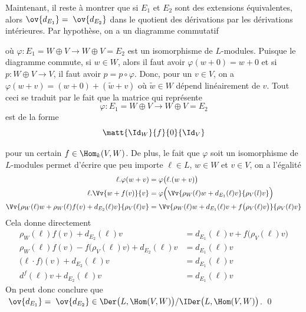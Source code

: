 \begin{Prop}
\begin{pre}
Maintenant, il reste à montrer que si $E_1$ et $E_2$ sont des extensions équivalentes, alors \linebreak $\ov{d_{E_1}} = \; \ov{d_{E_2}}$ dans le quotient des dérivations par les dérivations intérieures. Par hypothèse, on a un diagramme commutatif
\begin{center} \end{center}
où $\varphi : E_1 = W \oplus V \rightarrow W \oplus V = E_2$ est un isomorphisme de $L$-modules. Puisque le diagramme commute, si $w \in W$, alors il faut avoir $\varphi(w + 0) = w + 0$ et si $p : W \oplus V \rightarrow V$, il faut avoir $p = p \circ \varphi$. Donc, pour un $v \in V$,   on a $\varphi(w + v) = (w + 0) + (\tilde{w} + v)$ où $\tilde{w} \in W$ dépend linéairement de $v$. Tout ceci se traduit par le fait que la matrice qui représente 
$$ \varphi : E_1 = W \oplus V \rightarrow W \oplus V = E_2$$ 
est de la forme
$$ \matt{\Id_W}{f}{0}{\Id_V} $$

pour un certain $f \in \Hom_k(V,W)$. De plus, le fait que $\varphi$ soit un isomorphisme de $L$-modules permet d'écrire que peu importe $\ell \in L$, $w \in W$ et $v \in V$, on a l'égalité
\begin{align*}
\ell.\varphi(w + v) &= \varphi\big(\ell.(w + v)\big) \\
\ell.\Vv{w + f(v)}{v} &= \varphi\Big(\Vv{\rho_W(\ell)w + d_{E_1}(\ell)v}{\rho_V(l)v}\Big)\\
\Vv{\rho_W(\ell)w + \rho_W(\ell)f(v) + d_{E_2}(\ell)v}{\rho_V(\ell)v} &= \Vv{\rho_W(\ell)w + d_{E_1}(\ell)v + f\big(\rho_V(\ell)v\big)}{\rho_V(\ell)v}
\end{align*}
Cela donne directement 
\begin{align*}
\rho_W(\ell)f(v) + d_{E_2}(\ell)v &= d_{E_1}(\ell)v + f\big(\rho_V(\ell)v\big)\\
\rho_W(\ell)f(v) - f\big(\rho_V(\ell)v\big) + d_{E_2}(\ell)v &= d_{E_1}(\ell)v\\
\big(\ell \cdot f\big)(v) + d_{E_2}(\ell)v &= d_{E_1}(\ell)v\\
d^f(\ell)v + d_{E_2}(\ell)v &= d_{E_1}(\ell)v
\end{align*}
On peut donc conclure que $\; \ov{d_{E_1}} = \; \ov{d_{E_2}} \in \Der\big(L,\Hom(V,W)\big) / \IDer\big(L,\Hom(V,W)\big)$. \qed
\end{pre}
\end{Prop}

